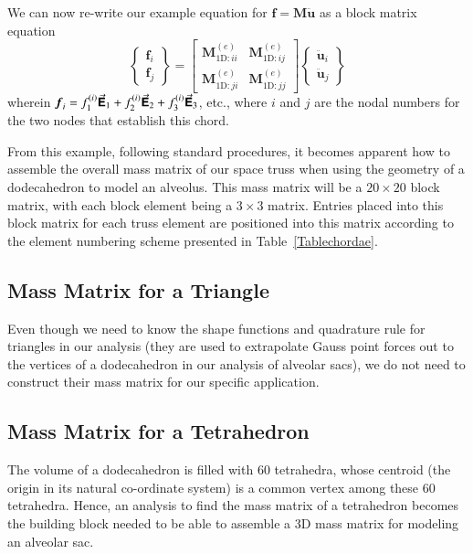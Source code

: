 We can now re-write our example equation for $\boldsymbol{f} = \mathbf{M} \ddot{\boldsymbol{u}}$ as a block matrix equation
\begin{displaymath}
\left\{ \begin{matrix} 
\boldsymbol{f}_i \\ \boldsymbol{f}_j
\end{matrix} \right\} = 
\begin{bmatrix}
\mathbf{M}^{(e)}_{\mathrm{1D}:ii} & \mathbf{M}^{(e)}_{\mathrm{1D}:ij} \\
\mathbf{M}^{(e)}_{\mathrm{1D}:ji} & \mathbf{M}^{(e)}_{\mathrm{1D}:jj}
\end{bmatrix} \left\{ \begin{matrix} 
\ddot{\boldsymbol{u}}_i \\ \ddot{\boldsymbol{u}}_j
\end{matrix} \right\}
\end{displaymath} 
wherein $\boldsymbol{f}_i = f^{(i)}_1 \vec{\boldsymbol{\mathsf{E}}}_1 + f^{(i)}_2 \vec{\boldsymbol{\mathsf{E}}}_2 + f^{(i)}_3 \vec{\boldsymbol{\mathsf{E}}}_3$, etc., where $i$ and $j$ are the nodal numbers for the two nodes that establish this chord.

From this example, following standard procedures, \cite{ClaytonChung18} it becomes apparent how to assemble the overall mass matrix of our space truss when using the geometry of a dodecahedron to model an alveolus.  This mass matrix will be a $20 \! \times \! 20$ block matrix, with each block element being a $3 \! \times \! 3$ matrix.  Entries placed into this block matrix for each truss element are positioned into this matrix according to the element numbering scheme presented in Table~\ref{Tablechordae}.

\subsection{Mass Matrix for a Triangle}

Even though we need to know the shape functions and quadrature rule for triangles in our analysis (they are used to extrapolate Gauss point forces out to the vertices of a dodecahedron in our analysis of alveolar sacs), we do not need to construct their mass matrix for our specific application.

\subsection{Mass Matrix for a Tetrahedron}

The volume of a dodecahedron is filled with 60 tetrahedra, whose centroid (the origin in its natural co-ordinate system) is a common vertex among these 60 tetrahedra. Hence, an analysis to find the mass matrix of a tetrahedron becomes the building block needed to be able to assemble a 3D mass matrix for modeling an alveolar sac.

